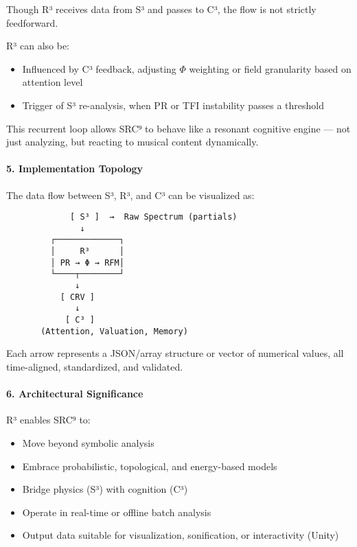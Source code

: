 \documentclass{article}
\begin{document}
Though R³ receives data from S³ and passes to C³, the flow is not strictly feedforward.

R³ can also be:

\begin{itemize}
    \item Influenced by C³ feedback, adjusting $\Phi$ weighting or field granularity based on attention level
    \item Trigger of S³ re-analysis, when PR or TFI instability passes a threshold
\end{itemize}

This recurrent loop allows SRC⁹ to behave like a resonant cognitive engine — not just analyzing, but reacting to musical content dynamically.

\paragraph{5. Implementation Topology}

The data flow between S³, R³, and C³ can be visualized as:

\begin{verbatim}
             [ S³ ]  →  Raw Spectrum (partials)
               ↓
         ┌─────────────┐
         │     R³      │
         │ PR → Φ → RFM│
         └────┬────────┘
              ↓
           [ CRV ]
              ↓
            [ C³ ]
       (Attention, Valuation, Memory)
\end{verbatim}

Each arrow represents a JSON/array structure or vector of numerical values, all time-aligned, standardized, and validated.

\paragraph{6. Architectural Significance}

R³ enables SRC⁹ to:

\begin{itemize}
    \item Move beyond symbolic analysis
    \item Embrace probabilistic, topological, and energy-based models
    \item Bridge physics (S³) with cognition (C³)
    \item Operate in real-time or offline batch analysis
    \item Output data suitable for visualization, sonification, or interactivity (Unity)
\end{itemize}
\end{document}
